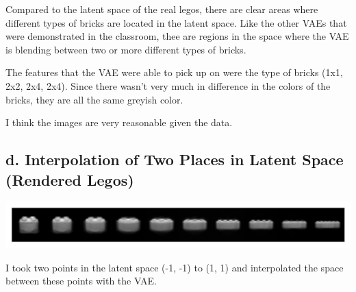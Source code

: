 \documentclass{article}
\begin{document}
Compared to the latent space of the real legos, there are clear
areas where different types of bricks are located in the latent space.
Like the other VAEs that were demonstrated in the classroom,
thee are regions in the space where the VAE is blending between two or
more different types of bricks.

The features that the VAE were able to pick up on were
the type of bricks (1x1, 2x2, 2x4, 2x4). Since there
wasn't very much in difference in the colors of the bricks,
they are all the same greyish color.

I think the images are very reasonable given the data.

\subsection*{d. Interpolation of Two Places in Latent Space (Rendered Legos)}
\begin{center}
  \includegraphics[scale=0.9]{interpolation-lego-blender-4}
\end{center}

I took two points in the latent space (-1, -1) to (1, 1) and interpolated
the space between these points with the VAE.

\end{document}
